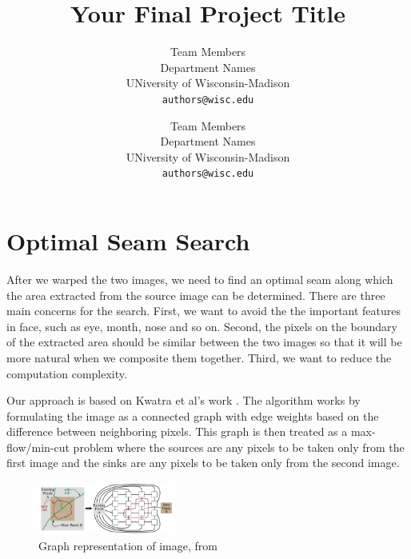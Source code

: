 \documentclass[10pt,twocolumn,letterpaper]{article}
\begin{document}
\title{Your Final Project Title}

\author{Team Members\\
Department Names\\
UNiversity of Wisconsin-Madison\\
{\tt\small authors@wisc.edu}
\and
Team Members\\
Department Names\\
UNiversity of Wisconsin-Madison\\
{\tt\small authors@wisc.edu}
}

\maketitle


\section{Optimal Seam Search}

After we warped the two images, we need to find an optimal seam along which the area extracted from the source image can be determined. There are three main concerns for the search. First, we want to avoid the the important features in face, such as eye, month, nose and so on. Second, the pixels on the boundary of the extracted area should be similar between the two images so that it will be more natural when we composite them together. Third, we want to reduce the computation complexity.

Our approach is based on Kwatra et al's work \cite{kwatra2003graphcut}. The algorithm works by formulating the image as a connected graph with edge weights based on the difference between neighboring pixels. This graph is then treated as a max-flow/min-cut problem where the sources are any pixels to be taken only from the first image and the sinks are any pixels to be taken only from the second image.

\begin{figure}[hb]
  \centering
  \includegraphics[width=0.4\textwidth]{graph_image.png}
  \caption{Graph representation of image, from \cite{kwatra2003graphcut}}\label{graph}
\end{figure}
\end{document}
